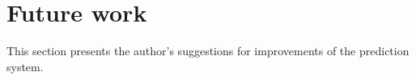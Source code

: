 \section{Future work}

This section presents the author's suggestions for improvements of the prediction system.